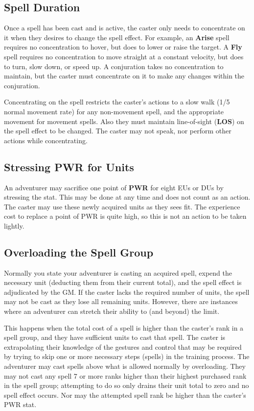 \begin{multicols*}{2}
\subsection{Spell Duration}
Once a spell has been cast and is active, the caster only needs to concentrate on it when they desires to change the spell effect. For example, an \textbf{Arise} spell requires no concentration to hover, but does to lower or raise the target. A \textbf{Fly} spell requires no concentration to move straight at a constant velocity, but does to turn, slow down, or speed up. A conjuration takes no concentration to maintain, but the caster must concentrate on it to make any changes within the conjuration.

Concentrating on the spell restricts the caster's actions to a slow walk (1/5 normal movement rate) for any non-movement spell, and the appropriate movement for movement spells. Also they must maintain line-of-sight (\textbf{LOS}) on the spell effect to be changed. The caster may not speak, nor perform other actions while concentrating.
\subsection{Stressing PWR for Units}
An adventurer may sacrifice one point of \textbf{PWR} for eight EUs or DUs by stressing the stat. This may be done at any time and does not count as an action. The caster may use these newly acquired units as they sees fit. The experience cost to replace a point of PWR is quite high, so this is not an action to be taken lightly.
\subsection{Overloading the Spell Group}
Normally you state your adventurer is casting an acquired spell, expend the necessary unit (deducting them from their current total), and the spell effect is adjudicated by the GM. If the caster lacks the required number of units, the spell may not be cast as they lose all remaining units. However, there are instances where an adventurer can stretch their ability to (and beyond) the limit.

This happens when the total cost of a spell is higher than the caster's rank in a spell group, and they have sufficient units to cast that spell. The caster is extrapolating their knowledge of the gestures and control that may be required by trying to skip one or more necessary steps (spells) in the training process. The adventurer may cast spells above what is allowed normally by overloading. They may not cast any spell 7 or more ranks higher than their highest purchased rank in the spell group; attempting to do so only drains their unit
total to zero and no spell effect occurs. Nor may the attempted spell rank be higher than the caster's PWR stat.


\end{multicols*}
